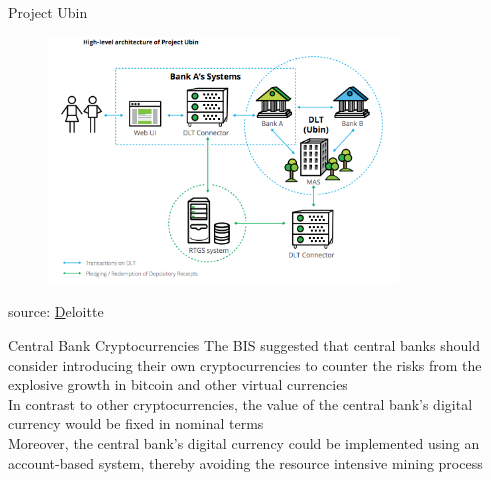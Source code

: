 \documentclass[9pt]{beamer}
\begin{document}

\begin{frame}{Project Ubin}
	\begin{figure}[]
		\centering
		\includegraphics  [width=93mm]{Images/ubin}
	\end{figure}
	\begin{scriptsize}
		source: \href{http://www.mas.gov.sg/~/media/ProjectUbin/Project\%20Ubin\%20\%20SGD\%20on\%20Distributed\%20Ledger.pdf}Deloitte
	\end{scriptsize}
\end{frame}


\begin{frame}{Central Bank Cryptocurrencies}
	The BIS suggested that central banks should consider introducing their own cryptocurrencies to counter the risks from the explosive growth in bitcoin and other virtual currencies\\ \vspace{3mm}
	In contrast to other cryptocurrencies, the value of the central bank's digital currency would be fixed in nominal terms\\ \vspace{3mm}
	Moreover, the central bank's digital currency could be implemented using an account-based system, thereby avoiding the resource intensive mining process
\end{frame}

\end{document}
